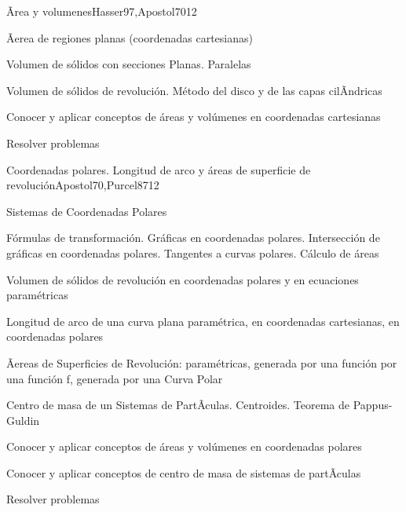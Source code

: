\begin{syllabus}
\begin{unit}{Ãrea y volumenes}{Hasser97,Apostol70}{12}
\begin{topics}
      \item Ãerea de regiones planas (coordenadas cartesianas)
      \item Volumen de sólidos con secciones Planas. Paralelas
      \item Volumen de sólidos de revolución. Método del disco y de las capas cilÃ­ndricas
\end{topics}

\begin{unitgoals}
	\item Conocer y aplicar conceptos de áreas y volúmenes en coordenadas cartesianas
	\item Resolver problemas
\end{unitgoals}
\end{unit}

\begin{unit}{Coordenadas polares. Longitud de arco y áreas de superficie de revolución}{Apostol70,Purcel87}{12}
\begin{topics}
	\item Sistemas de Coordenadas Polares
	\item Fórmulas de transformación. Gráficas en coordenadas polares. Intersección de gráficas en coordenadas polares. Tangentes a curvas polares. Cálculo de áreas
	\item Volumen de sólidos de revolución en coordenadas polares y en ecuaciones paramétricas
	\item Longitud de arco de una curva plana paramétrica, en coordenadas cartesianas, en  coordenadas polares
	\item Ãereas de Superficies de Revolución: paramétricas,  generada por una función por una  función f, generada por una Curva  Polar
	\item Centro de masa de un Sistemas de PartÃ­culas. Centroides. Teorema de Pappus-Guldin
\end{topics}

\begin{unitgoals}
	\item Conocer y aplicar conceptos de áreas y volúmenes en coordenadas polares
	\item Conocer y aplicar conceptos de centro de masa de sistemas de partÃ­culas
	\item Resolver problemas
\end{unitgoals}
\end{unit}


\end{syllabus}
